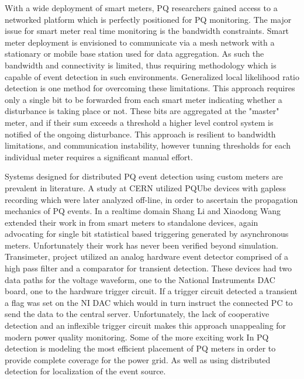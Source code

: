 With a wide deployment of smart meters, PQ researchers gained access to a networked platform which is perfectly positioned for PQ monitoring.\cite{hoglund2012using} The major issue for smart meter real time monitoring is the bandwidth constraints. Smart meter deployment is envisioned to communicate via a mesh network with a stationary or mobile base station used for data aggregation. As such the bandwidth and connectivity is limited, thus requiring methodology which is capable of event detection in such environments. Generalized local likelihood ratio detection is one method for overcoming these limitations. This approach requires only a single bit to be forwarded from each smart meter indicating whether a disturbance is taking place or not. These bits are aggregated at the "master" meter, and if their sum exceeds a threshold a higher level control system is notified of the ongoing disturbance.\cite{li2016cooperative} This approach is resilient to bandwidth limitations, and communication instability, however tunning thresholds for each individual meter requires a significant manual effort.

Systems designed for distributed PQ event detection using custom meters are prevalent in literature. A study at CERN utilized PQUbe devices with gapless recording which were later analyzed off-line, in order to ascertain the propagation mechanics of PQ events.\cite{kahle2016power} In a realtime domain Shang Li and Xiaodong Wang extended their work in \cite{li2016cooperative} from smart meters to standalone devices, again advocating for single bit statistical based triggering generated by asynchronous meters.\cite{li2013monitoring} Unfortunately their work has never been verified beyond simulation. Transimeter, project utilized an analog hardware event detector comprised of a high pass filter and a comparator for transient detection. These devices had two data paths for the voltage waveform, one to the National Instruments DAC board, one to the hardware trigger circuit. If a trigger circuit detected a transient a flag was set on the NI DAC which would in turn instruct the connected PC to send the data to the central server.\cite{daponte2004transientmeter} Unfortunately, the lack of cooperative detection and an inflexible trigger circuit makes this approach unappealing for modern power quality monitoring. Some of the more exciting work In PQ detection is modeling the most efficient placement of PQ meters in order to provide complete coverage for the power grid. \cite{won2006new} As well as using distributed detection for localization of the event source.\cite{parsons1998direction} \cite{polajvzer2017evaluation}


